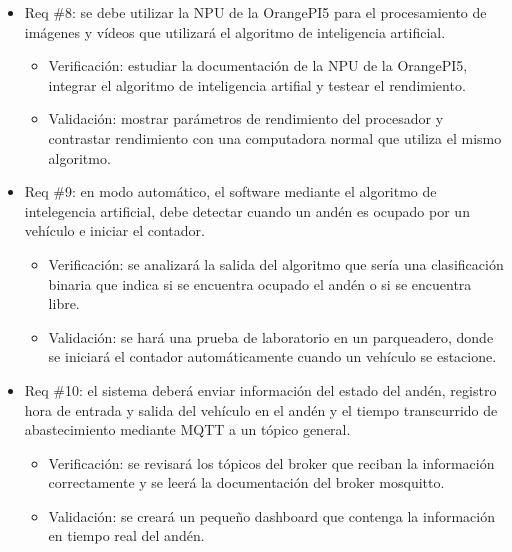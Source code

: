 \documentclass[
11pt, %
]{charter}
\begin{document}
\begin{itemize} 
\item Req \#8: se debe utilizar la NPU de la OrangePI5 para el procesamiento de imágenes y vídeos que utilizará el algoritmo de inteligencia artificial.
\begin{itemize}
		\item Verificación: estudiar la documentación de la NPU de la OrangePI5, integrar el algoritmo de inteligencia artifial y testear el rendimiento. 
		\item Validación: mostrar parámetros de rendimiento del procesador y contrastar rendimiento con una computadora normal que utiliza el mismo algoritmo.  
	\end{itemize}
	
	\end{itemize}

\begin{itemize} 
\item Req \#9: en modo automático, el software mediante el algoritmo de intelegencia artificial, debe detectar cuando un andén es ocupado por un vehículo e iniciar el contador.
\begin{itemize}
		\item Verificación: se analizará la salida del algoritmo que sería una clasificación binaria que indica si se encuentra ocupado el andén o si se encuentra libre.
		\item Validación: se hará una prueba de laboratorio en un parqueadero, donde se iniciará el contador automáticamente cuando un vehículo se estacione.  
	\end{itemize}
	
	\end{itemize}

\begin{itemize} 
\item Req \#10: el sistema deberá enviar información del estado del andén, registro hora de entrada y salida del vehículo en el andén y el tiempo transcurrido de abastecimiento mediante MQTT a un tópico general.
\begin{itemize}
		\item Verificación: se revisará los tópicos del broker que reciban la información correctamente y se leerá la documentación del broker mosquitto.
		\item Validación: se creará un pequeño dashboard que contenga la información en tiempo real del andén.  
	\end{itemize}
	
	\end{itemize}
\end{document}

